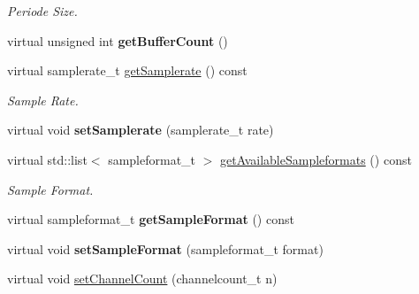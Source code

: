 \begin{DoxyCompactItemize}
\begin{DoxyCompactList}\small\item\em Periode Size. \end{DoxyCompactList}\item 
\hypertarget{classNl_1_1AudioAlsa_a17f6570ad5501c84faf0f06ff3378793}{}virtual unsigned int {\bfseries get\+Buffer\+Count} ()\label{classNl_1_1AudioAlsa_a17f6570ad5501c84faf0f06ff3378793}

\item 
\hypertarget{classNl_1_1AudioAlsa_a450390b0bbf9465c0a3c9caaf61a4079}{}virtual samplerate\+\_\+t \hyperlink{classNl_1_1AudioAlsa_a450390b0bbf9465c0a3c9caaf61a4079}{get\+Samplerate} () const \label{classNl_1_1AudioAlsa_a450390b0bbf9465c0a3c9caaf61a4079}

\begin{DoxyCompactList}\small\item\em Sample Rate. \end{DoxyCompactList}\item 
\hypertarget{classNl_1_1AudioAlsa_a892cf5818d0e7fa43ebc85f4d882f804}{}virtual void {\bfseries set\+Samplerate} (samplerate\+\_\+t rate)\label{classNl_1_1AudioAlsa_a892cf5818d0e7fa43ebc85f4d882f804}

\item 
\hypertarget{classNl_1_1AudioAlsa_a5c95174097753e5bae87e3f943b042c9}{}virtual std\+::list$<$ sampleformat\+\_\+t $>$ \hyperlink{classNl_1_1AudioAlsa_a5c95174097753e5bae87e3f943b042c9}{get\+Available\+Sampleformats} () const \label{classNl_1_1AudioAlsa_a5c95174097753e5bae87e3f943b042c9}

\begin{DoxyCompactList}\small\item\em Sample Format. \end{DoxyCompactList}\item 
\hypertarget{classNl_1_1AudioAlsa_accc91631cf20bc1de1add888c30e007e}{}virtual sampleformat\+\_\+t {\bfseries get\+Sample\+Format} () const \label{classNl_1_1AudioAlsa_accc91631cf20bc1de1add888c30e007e}

\item 
\hypertarget{classNl_1_1AudioAlsa_adfd02364854decfdae10f1dcfcf5292d}{}virtual void {\bfseries set\+Sample\+Format} (sampleformat\+\_\+t format)\label{classNl_1_1AudioAlsa_adfd02364854decfdae10f1dcfcf5292d}

\item 
\hypertarget{classNl_1_1AudioAlsa_aad4859e60c5b2f393224d9fe8728bd74}{}virtual void \hyperlink{classNl_1_1AudioAlsa_aad4859e60c5b2f393224d9fe8728bd74}{set\+Channel\+Count} (channelcount\+\_\+t n)\label{classNl_1_1AudioAlsa_aad4859e60c5b2f393224d9fe8728bd74}


\end{DoxyCompactItemize}
